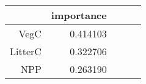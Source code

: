 \begin{tabular}{rrrrr}
\toprule
 & importance \\
\midrule
VegC & 0.414103 \\
LitterC & 0.322706 \\
NPP & 0.263190 \\
\bottomrule
\end{tabular}
